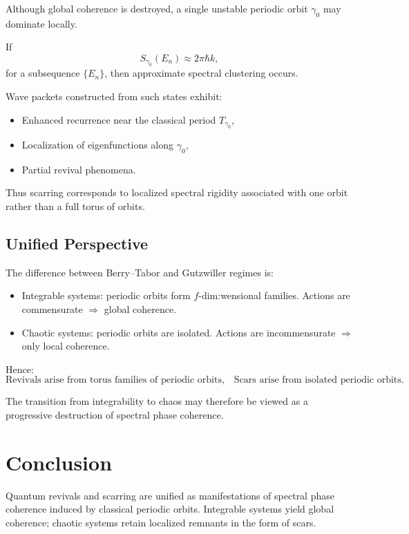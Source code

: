 \documentclass[11pt]{article}
\begin{document}
Although global coherence is destroyed, 
a single unstable periodic orbit $\gamma_0$ may dominate locally.

If
\[
S_{\gamma_0}(E_n)\approx 2\pi\hbar k,
\]
for a subsequence $\{E_n\}$,
then approximate spectral clustering occurs.

Wave packets constructed from such states exhibit:

\begin{itemize}
\item Enhanced recurrence near the classical period $T_{\gamma_0}$,
\item Localization of eigenfunctions along $\gamma_0$,
\item Partial revival phenomena.
\end{itemize}

Thus scarring corresponds to localized spectral rigidity 
associated with one orbit rather than a full torus of orbits.

\subsection{Unified Perspective}

The difference between Berry--Tabor and Gutzwiller regimes is:

\begin{itemize}
\item Integrable systems: periodic orbits form $f$-dim:wensional families.
      Actions are commensurate $\Rightarrow$ global coherence.
\item Chaotic systems: periodic orbits are isolated.
      Actions are incommensurate $\Rightarrow$ only local coherence.
\end{itemize}

Hence:
\[
\boxed{
\text{Revivals arise from torus families of periodic orbits,}
\quad
\text{Scars arise from isolated periodic orbits.}
}
\]

The transition from integrability to chaos may therefore be viewed as
a progressive destruction of spectral phase coherence.

\section{Conclusion}

Quantum revivals and scarring are unified as manifestations of 
spectral phase coherence induced by classical periodic orbits. 
Integrable systems yield global coherence; chaotic systems retain 
localized remnants in the form of scars.
\end{document}
